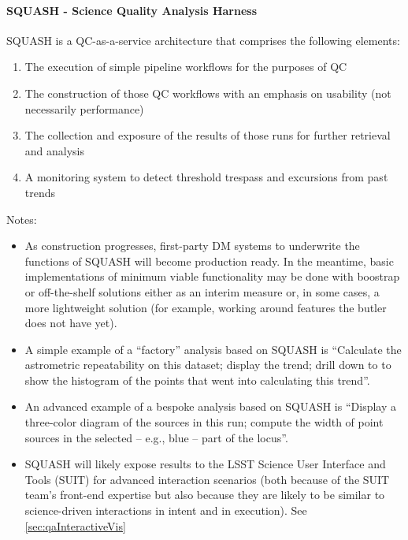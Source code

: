 \paragraph{SQUASH - Science Quality Analysis Harness}
\label{sec:qaSquash}

SQUASH is a QC-as-a-service architecture that comprises the following elements:

\begin{enumerate}

\item The execution of simple pipeline workflows for the purposes of QC

\item The construction of those QC workflows with an emphasis on usability (not necessarily performance)

\item The collection and exposure of the results of those runs for further retrieval and analysis

\item A monitoring system to detect threshold trespass and excursions from past trends

\end{enumerate}

Notes:

\begin{itemize}

\item As construction progresses, first-party DM systems to underwrite the functions of SQUASH will become production ready. In the meantime, basic implementations of minimum viable functionality may be done with boostrap or off-the-shelf solutions either as an interim measure or, in some cases, a more lightweight solution (for example, working around features the butler does not have yet).

\item A simple example of a ``factory'' analysis based on SQUASH is ``Calculate the astrometric repeatability on this dataset; display the trend; drill down to to show the histogram of the points that went into calculating this trend''.

\item An advanced example of a bespoke analysis based on SQUASH is ``Display a three-color diagram of the sources in this run; compute the width of point sources in the selected -- e.g., blue -- part of the locus''.

\item SQUASH will likely expose results to the LSST Science User Interface and Tools (SUIT) for advanced interaction scenarios (both because of the SUIT team's front-end expertise but also because they are likely to be similar to science-driven interactions in intent and in execution). See \ref{sec:qaInteractiveVis}

\end{itemize}

